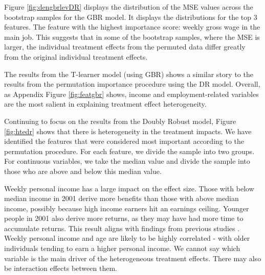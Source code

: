 \documentclass[12pt, a4paper]{article}
\begin{document}
Figure \ref{fig:dengbrlevDR} displays the distribution of the MSE values across the bootstrap samples for the GBR model. It displays the distributions for the top 3 features. The feature with the highest importance score: weekly gross wage in the main job. This suggests that in some of the bootstrap samples, where the MSE is larger, the individual treatment effects from the permuted data differ greatly from the original individual treatment effects.

The results from the T-learner model (using GBR) shows a similar story to the results from the permutation importance procedure using the DR model. Overall, as Appendix Figure \ref{fig:featgbr} shows, income and employment-related variables are the most salient in explaining treatment effect heterogeneity. 



Continuing to focus on the results from the Doubly Robust model, Figure \ref{fig:htedr} shows that there is heterogeneity in the treatment impacts. We have identified the features that were considered most important according to the permutation procedure. For each feature, we divide the sample into two groups. For continuous variables, we take the median value and divide the sample into those who are above and below this median value. 

Weekly personal income has a large impact on the effect size. Those with below median income in 2001 derive more benefits than those with above median income, possibly because high income earners hit an earnings ceiling. Younger people in 2001 also derive more returns, as they may have had more time to accumulate returns. This result aligns with findings from previous studies \citep{polidano2016,dorsett2016,perales2017}. Weekly personal income and age are likely to be highly correlated - with older individuals tending to earn a higher personal income. We cannot say which variable is the main driver of the heterogeneous treatment effects. There may also be interaction effects between them.
\end{document}
